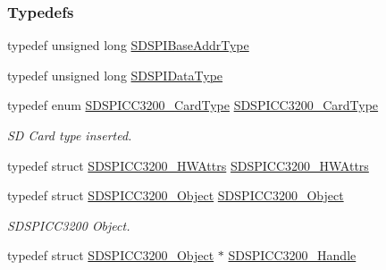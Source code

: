 \subsubsection*{Typedefs}
\begin{DoxyCompactItemize}
\item 
typedef unsigned long \hyperlink{_s_d_s_p_i_c_c3200_8h_ad2ee2f6fbdb79c0577161ae92a7f1650}{S\-D\-S\-P\-I\-Base\-Addr\-Type}
\item 
typedef unsigned long \hyperlink{_s_d_s_p_i_c_c3200_8h_ae10295fbeb91d6f844cc3694462f6a4b}{S\-D\-S\-P\-I\-Data\-Type}
\item 
typedef enum \hyperlink{_s_d_s_p_i_c_c3200_8h_aef9c37db8744ba414b93ef56c1473be7}{S\-D\-S\-P\-I\-C\-C3200\-\_\-\-Card\-Type} \hyperlink{_s_d_s_p_i_c_c3200_8h_aeef94f747a3b3759b7220d3c78881d05}{S\-D\-S\-P\-I\-C\-C3200\-\_\-\-Card\-Type}
\begin{DoxyCompactList}\small\item\em S\-D Card type inserted. \end{DoxyCompactList}\item 
typedef struct \hyperlink{struct_s_d_s_p_i_c_c3200___h_w_attrs}{S\-D\-S\-P\-I\-C\-C3200\-\_\-\-H\-W\-Attrs} \hyperlink{_s_d_s_p_i_c_c3200_8h_a49c29170776eca52c0d66c231a3736e3}{S\-D\-S\-P\-I\-C\-C3200\-\_\-\-H\-W\-Attrs}
\item 
typedef struct \hyperlink{struct_s_d_s_p_i_c_c3200___object}{S\-D\-S\-P\-I\-C\-C3200\-\_\-\-Object} \hyperlink{_s_d_s_p_i_c_c3200_8h_ac7c8f2ad346149f283d5a267a16feee7}{S\-D\-S\-P\-I\-C\-C3200\-\_\-\-Object}
\begin{DoxyCompactList}\small\item\em S\-D\-S\-P\-I\-C\-C3200 Object. \end{DoxyCompactList}\item 
typedef struct \hyperlink{struct_s_d_s_p_i_c_c3200___object}{S\-D\-S\-P\-I\-C\-C3200\-\_\-\-Object} $\ast$ \hyperlink{_s_d_s_p_i_c_c3200_8h_a5b5f40039814acdfe2a666c59a845596}{S\-D\-S\-P\-I\-C\-C3200\-\_\-\-Handle}
\end{DoxyCompactItemize}
